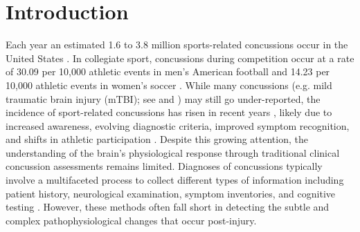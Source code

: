 \documentclass[12pt]{article}
\begin{document}
\section{Introduction}
\label{sec:intro}

Each year an estimated 1.6 to 3.8 million sports-related concussions occur in the United States \parencite{langlois2006EpidemiologyImpactTraumatic,daneshvar2011EpidemiologySportRelatedConcussion,barkhoudarian2016MolecularPathophysiologyConcussive}. In collegiate sport, concussions during competition occur at a rate of 30.09 per 10,000 athletic events in men's American football and 14.23 per 10,000 athletic events in women's soccer \parencite{pierpoint2021EpidemiologySportRelatedConcussion}. While many concussions (e.g. mild traumatic brain injury (mTBI); see \textcite{mayer2017SpectrumMildTraumatic} and \textcite{silverberg2023AmericanCongressRehabilitation}) may still go under-reported, the incidence of sport-related concussions has risen in recent years \parencite{coronado2015TrendsSportsRecreationRelated,pierpoint2021EpidemiologySportRelatedConcussion}, likely due to increased awareness, evolving diagnostic criteria, improved symptom recognition, and shifts in athletic participation \parencite{yang2017NewRecurrentConcussions}. Despite this growing attention, the understanding of the brain's physiological response through traditional clinical concussion assessments remains limited. Diagnoses of concussions typically involve a multifaceted process to collect different types of information including patient history, neurological examination, symptom inventories, and cognitive testing \parencite{patricios2023ConsensusStatementConcussion}. However, these methods often fall short in detecting the subtle and complex pathophysiological changes that occur post-injury.
\end{document}
